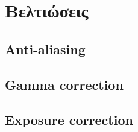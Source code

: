 \chapter{Βελτιώσεις}

\begin{sloppypar}

\section{Anti-aliasing}
\paragraph{}

\section{Gamma correction}
\paragraph{}

\section{Exposure correction}
\paragraph{}

\end{sloppypar}

